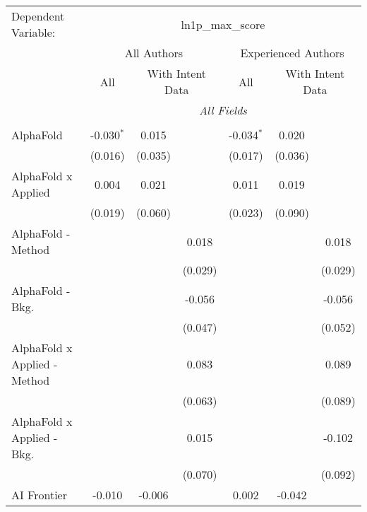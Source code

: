 \begingroup
\centering
\begin{tabular}{lcccccc}
   \tabularnewline \midrule \midrule
   Dependent Variable: & \multicolumn{6}{c}{ln1p\_max\_score}\\
 & \multicolumn{3}{c}{All Authors} & \multicolumn{3}{c}{Experienced Authors} \\
\cmidrule(lr){2-4} \cmidrule(lr){5-7}
 & \multicolumn{1}{c}{All} & \multicolumn{2}{c}{With Intent Data} & \multicolumn{1}{c}{All} & \multicolumn{2}{c}{With Intent Data} \\
\cmidrule(lr){2-2} \cmidrule(lr){3-4} \cmidrule(lr){5-5} \cmidrule(lr){6-7}
 & \multicolumn{6}{c}{\textit{All Fields}} \\ \\
   AlphaFold                      & -0.030$^{*}$ & 0.015   &             & -0.034$^{*}$ & 0.020   &   \\   
                                  & (0.016)      & (0.035) &             & (0.017)      & (0.036) &   \\   
   AlphaFold x Applied            & 0.004        & 0.021   &             & 0.011        & 0.019   &   \\   
                                  & (0.019)      & (0.060) &             & (0.023)      & (0.090) &   \\   
   AlphaFold - Method             &              &         & 0.018       &              &         & 0.018\\   
                                  &              &         & (0.029)     &              &         & (0.029)\\   
   AlphaFold - Bkg.               &              &         & -0.056      &              &         & -0.056\\   
                                  &              &         & (0.047)     &              &         & (0.052)\\   
   AlphaFold x Applied - Method   &              &         & 0.083       &              &         & 0.089\\   
                                  &              &         & (0.063)     &              &         & (0.089)\\   
   AlphaFold x Applied - Bkg.     &              &         & 0.015       &              &         & -0.102\\   
                                  &              &         & (0.070)     &              &         & (0.092)\\   
   AI Frontier                    & -0.010       & -0.006  &             & 0.002        & -0.042  &   \\   

\end{tabular}
